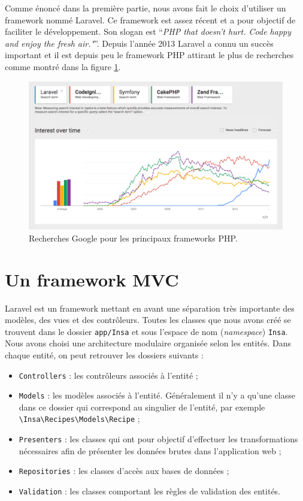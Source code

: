 Comme énoncé dans la première partie, nous avons fait le choix d'utiliser un framework nommé Laravel. Ce framework est assez récent et a pour objectif de faciliter le développement. Son slogan est \enquote{\textit{PHP that doesn't hurt. Code happy and enjoy the fresh air."}}. Depuis l'année 2013 Laravel a connu un succès important et il est depuis peu le framework PHP attirant le plus de recherches comme montré dans la figure \ref{fig:trends-php-frameworks}.

\begin{figure}[H]
	\centering
	\includegraphics[width=1\textwidth]{images/trends-php-frameworks.png}
	\caption{Recherches Google pour les principaux frameworks PHP.}
	\label{fig:trends-php-frameworks}
\end{figure}

\section{Un framework MVC}
	Laravel est un framework mettant en avant une séparation très importante des modèles, des vues et des contrôleurs. Toutes les classes que nous avons créé se trouvent dans le dossier \verb|app/Insa| et sous l'espace de nom (\textit{namespace}) \verb|Insa|.\\

	Nous avons choisi une architecture modulaire organisée selon les entités. Dans chaque entité, on peut retrouver les dossiers suivants :
	\begin{itemize}
		\item \verb|Controllers| : les contrôleurs associés à l'entité ;
		\item \verb|Models| : les modèles associés à l'entité. Généralement il n'y a qu'une classe dans ce dossier qui correspond au singulier de l'entité, par exemple \verb|\Insa\Recipes\Models\Recipe| ;
		\item \verb|Presenters| : les classes qui ont pour objectif d'effectuer les transformations nécessaires afin de présenter les données brutes dans l'application web ;
		\item \verb|Repositories| : les classes d'accès aux bases de données ;
		\item \verb|Validation| : les classes comportant les règles de validation des entités.
	\end{itemize}

